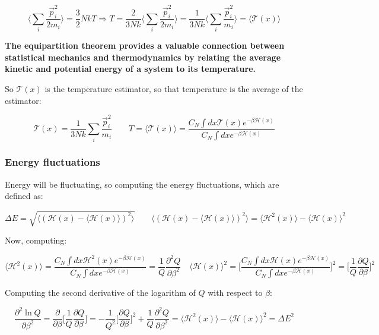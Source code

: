 	$$\biggl\langle\sum\limits_{i}\frac{\vec{p}_i^2}{2m_i}\biggr\rangle = \frac{3}{2}NkT\Rightarrow T = \frac{2}{3Nk}\biggl\langle\sum\limits_i\frac{\vec{p}_i^2}{2m_i}\biggr\rangle = \frac{1}{3Nk}\biggl\langle\sum\limits_i\frac{\vec{p}_i^2}{m_i}\biggr\rangle = \langle\mathcal{T}(x)\rangle$$

	\begin{center}
		\textbf{The equipartition theorem provides a valuable connection between statistical mechanics and thermodynamics by relating the average kinetic and potential energy of a system to its temperature.}
	\end{center}


	So $\mathcal{T}(x)$ is the temperature estimator, so that temperature is the average of the estimator:

	$$\mathcal{T}(x) = \frac{1}{3Nk}\sum\limits_i\frac{\vec{p}_i^2}{m_i}\qquad T = \langle\mathcal{T}(x)\rangle = \frac{C_N\int dx\mathcal{T}(x)e^{-\beta\mathcal{H}(x)}}{C_N\int dx e^{-\beta\mathcal{H}(x)}}$$

		\subsubsection{Energy fluctuations}
		Energy will be fluctuating, so computing the energy fluctuations, which are defined as:

		$$\Delta E = \sqrt{\langle(\mathcal{H}(x)-\langle\mathcal{H}(x)\rangle)^2\rangle}\qquad \langle(\mathcal{H}(x)-\langle\mathcal{H}(x)\rangle)^2\rangle = \langle\mathcal{H}^2(x)\rangle - \langle\mathcal{H}(x)\rangle^2$$

		Now, computing:

		$$\langle\mathcal{H}^2(x)\rangle = \frac{C_N\int dx\mathcal{H}^2(x)e^{-\beta\mathcal{H}(x)}}{C_N\int dxe^{-\beta\mathcal{H}(x)}} = \frac{1}{Q}\frac{\partial^2 Q}{\partial \beta^2}\quad\langle\mathcal{H}(x)\rangle^2 = \biggl[\frac{C_N\int dx\mathcal{H}(x)e^{-\beta\mathcal{H}(x)}}{C_N\int dx e^{-\beta\mathcal{H}(x)}}\biggr]^2 = \biggl[\frac{1}{Q}\frac{\partial Q}{\partial\beta}\biggr]^2$$

		Computing the second derivative of the logarithm of $Q$ with respect to $\beta$:

		$$\frac{\partial^2\ln Q}{\partial \beta^2} = \frac{\partial}{\partial\beta}\biggl[\frac{1}{Q}\frac{\partial Q}{\partial\beta}\biggr] = -\frac{1}{Q^2}\biggl[\frac{\partial Q}{\partial\beta}\biggr]^2 + \frac{1}{Q}\frac{\partial^2 Q}{\partial\beta^2} = \langle\mathcal{H}^2(x)\rangle-\langle\mathcal{H}(x)\rangle^2 = \Delta E^2$$


